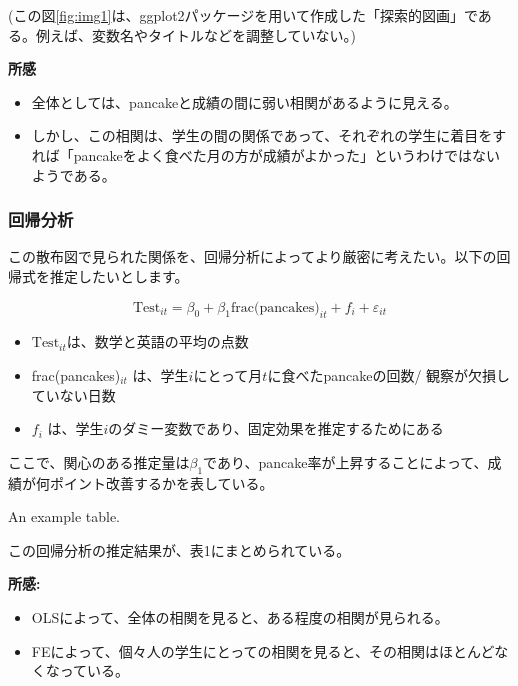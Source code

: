 \documentclass[xelatex,ja=standard]{bxjsarticle}
\begin{document}
(この図\ref{fig:img1}は、ggplot2パッケージを用いて作成した「探索的図画」である。例えば、変数名やタイトルなどを調整していない。)

\textbf{所感}
\begin{itemize}
\item 全体としては、pancakeと成績の間に弱い相関があるように見える。
\item しかし、この相関は、学生の間の関係であって、それぞれの学生に着目をすれば「pancakeをよく食べた月の方が成績がよかった」というわけではないようである。
\end{itemize}

\subsubsection{回帰分析}
この散布図で見られた関係を、回帰分析によってより厳密に考えたい。以下の回帰式を推定したいとします。

\begin{equation}
\text{Test}_{it} = \beta_0 + \beta_{1} \text{frac(pancakes)}_{it} + f_{i} + \varepsilon_{it}
\end{equation}

\begin{itemize}
\item $\text{Test}_{it}$は、数学と英語の平均の点数
\item frac(pancakes)$_{it}$ は、学生$i$にとって月$t$に食べたpancakeの回数/ 観察が欠損していない日数
\item $f_i$ は、学生$i$のダミー変数であり、固定効果を推定するためにある
\end{itemize}

ここで、関心のある推定量は$\beta_{1}$であり、pancake率が上昇することによって、成績が何ポイント改善するかを表している。


\begin{table}[h!]
\centering

\caption{\label{tab:widgets}An example table.}
\end{table}


この回帰分析の推定結果が、表1にまとめられている。

\vspace

\textbf{所感:}
\begin{itemize}
\item OLSによって、全体の相関を見ると、ある程度の相関が見られる。
\item FEによって、個々人の学生にとっての相関を見ると、その相関はほとんどなくなっている。
\end{itemize}
\end{document}
